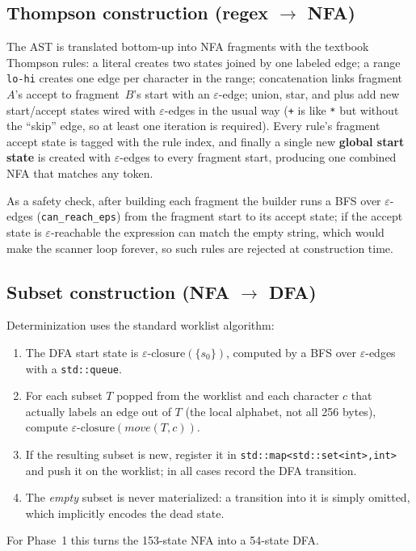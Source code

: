 \documentclass[11pt,a4paper]{article}
\begin{document}
\subsection{Thompson construction (regex $\rightarrow$ NFA)}
The AST is translated bottom-up into NFA fragments with the textbook Thompson
rules: a literal creates two states joined by one labeled edge; a range
\texttt{lo-hi} creates one edge per character in the range; concatenation links
fragment~$A$'s accept to fragment~$B$'s start with an $\varepsilon$-edge;
union, star, and plus add new start/accept states wired with
$\varepsilon$-edges in the usual way (\texttt{+} is like \texttt{*} but without
the ``skip'' edge, so at least one iteration is required). Every rule's fragment
accept state is tagged with the rule index, and finally a single new
\textbf{global start state} is created with $\varepsilon$-edges to every
fragment start, producing one combined NFA that matches any token.

As a safety check, after building each fragment the builder runs a BFS over
$\varepsilon$-edges (\texttt{can\_reach\_eps}) from the fragment start to its
accept state; if the accept state is $\varepsilon$-reachable the expression can
match the empty string, which would make the scanner loop forever, so such rules
are rejected at construction time.

\subsection{Subset construction (NFA $\rightarrow$ DFA)}
Determinization uses the standard worklist algorithm:
\begin{enumerate}
    \item The DFA start state is $\varepsilon\text{-closure}(\{s_0\})$, computed by a
          BFS over $\varepsilon$-edges with a \texttt{std::queue}.
    \item For each subset $T$ popped from the worklist and each character $c$
          that actually labels an edge out of $T$ (the local alphabet, not all
          256 bytes), compute
          $\varepsilon\text{-closure}(\mathit{move}(T, c))$.
    \item If the resulting subset is new, register it in
          \texttt{std::map<std::set<int>,int>} and push it on the worklist; in
          all cases record the DFA transition.
    \item The \emph{empty} subset is never materialized: a transition into it is
          simply omitted, which implicitly encodes the dead state.
\end{enumerate}
For Phase~1 this turns the 153-state NFA into a 54-state DFA.
\end{document}
